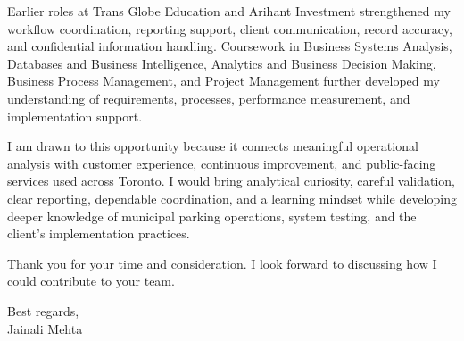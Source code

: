 \documentclass[letterpaper,10pt]{article}
\begin{document}
Earlier roles at Trans Globe Education and Arihant Investment strengthened my workflow coordination, reporting support, client communication, record accuracy, and confidential information handling. Coursework in Business Systems Analysis, Databases and Business Intelligence, Analytics and Business Decision Making, Business Process Management, and Project Management further developed my understanding of requirements, processes, performance measurement, and implementation support.

I am drawn to this opportunity because it connects meaningful operational analysis with customer experience, continuous improvement, and public-facing services used across Toronto. I would bring analytical curiosity, careful validation, clear reporting, dependable coordination, and a learning mindset while developing deeper knowledge of municipal parking operations, system testing, and the client's implementation practices.

Thank you for your time and consideration. I look forward to discussing how I could contribute to your team.

Best regards,\\[8pt]
Jainali Mehta
\end{document}
